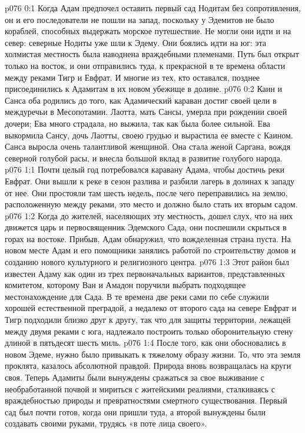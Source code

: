 \author{Солония}
\vs p076 0:1 Когда Адам предпочел оставить первый сад Нодитам без сопротивления, он и его последователи не пошли на запад, поскольку у Эдемитов не было кораблей, способных выдержать морское путешествие. Не могли они идти и на север: северные Нодиты уже шли к Эдему. Они боялись идти на юг: эта холмистая местность была наводнена враждебными племенами. Путь был открыт только на восток, и они отправились туда, к прекрасной в те времена области между реками Тигр и Евфрат. И многие из тех, кто оставался, позднее присоединились к Адамитам в их новом убежище в долине.
\vs p076 0:2 \pc Каин и Санса оба родились до того, как Адамический караван достиг своей цели в междуречьи в Месопотамии. Лаотта, мать Сансы, умерла при рождении своей дочери; Ева много страдала, но выжила, так как была более сильной. Ева выкормила Сансу, дочь Лаотты, своею грудью и вырастила ее вместе с Каином. Санса выросла очень талантливой женщиной. Она стала женой Саргана, вождя северной голубой расы, и внесла большой вклад в развитие голубого народа.
\vs p076 1:1 Почти целый год потребовался каравану Адама, чтобы достичь реки Евфрат. Они вышли к реке в сезон разлива и разбили лагерь в долинах к западу от нее. Они простояли там шесть недель, после чего переправились на землю, расположенную между реками, это место и должно было стать их вторым садом.
\vs p076 1:2 Когда до жителей, населяющих эту местность, дошел слух, что на них движется царь и первосвященник Эдемского Сада, они поспешили скрыться в горах на востоке. Прибыв, Адам обнаружил, что вожделенная страна пуста. На новом месте Адам и его помощники занялись работой по строительству домов и созданию нового культурного и религиозного центра.
\vs p076 1:3 Этот район был известен Адаму как один из трех первоначальных вариантов, представленных комитетом, которому Ван и Амадон поручили выбрать подходящее местонахождение для Сада. В те времена две реки сами по себе служили хорошей естественной преградой, а недалеко от второго сада на севере Евфрат и Тигр подходили близко друг к другу, так что для защиты территории, лежащей между двумя реками с юга, надлежало построить только оборонительную стену длиной в пятьдесят шесть миль.
\vs p076 1:4 \pc После того, как они обосновались в новом Эдеме, нужно было привыкать к тяжелому образу жизни. То, что эта земля проклята, казалось абсолютной правдой. Природа вновь возвращалась на круги своя. Теперь Адамиты были вынуждены сражаться за свое выживание с необработанной почвой и мириться с житейскими реалиями, сталкиваясь с враждебностью природы и превратностями смертного существования. Первый сад был почти готов, когда они пришли туда, а второй вынуждены были создавать своими руками, трудясь «в поте лица своего».
